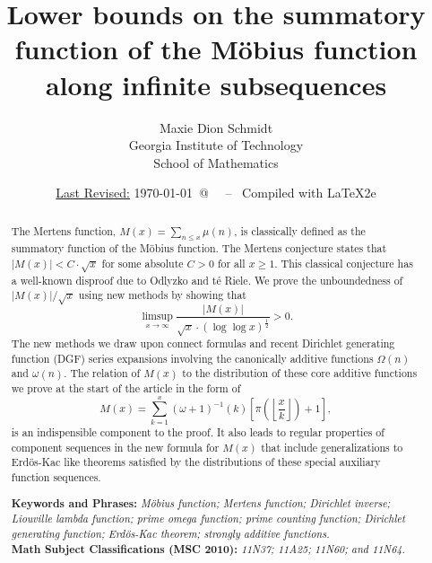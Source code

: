 \documentclass[11pt,reqno,a4letter]{article}
\title{
       \LARGE{
       Lower bounds on the summatory function of the M\"obius function along infinite subsequences 
       } 
}
\author{{\Large Maxie Dion Schmidt} \\ 
        {\normalsize Georgia Institute of Technology} \\[0.025cm] 
        {\normalsize School of Mathematics} 
}
\date{\small\underline{Last Revised:} \today \ @\ \hhmmsstime{} \ -- \ Compiled with \LaTeX2e}
\numberwithin{figure}{section}
\numberwithin{table}{section}
\theoremstyle{plain}
\numberwithin{theorem}{section}
\theoremstyle{definition}
\begin{document}
 

\maketitle

\begin{abstract} 
The Mertens function, $M(x) = \sum_{n \leq x} \mu(n)$, is classically 
defined as the summatory function of the M\"obius function. 
The Mertens conjecture states that $|M(x)| < C \cdot \sqrt{x}$ for some absolute $C > 0$ for all 
$x \geq 1$. 
This classical conjecture has a well-known disproof due to 
Odlyzko and t\'{e} Riele. 
We prove the unboundedness of $|M(x)| / \sqrt{x}$ using new methods by showing that 
$$\limsup_{x \rightarrow \infty} \frac{|M(x)|}{\sqrt{x} \cdot (\log\log x)^{\frac{1}{2}}} > 0.$$ 
The new methods we draw upon connect formulas and recent 
Dirichlet generating function (DGF) series expansions involving the canonically 
additive functions $\Omega(n)$ and $\omega(n)$. 
The relation of $M(x)$ to the distribution of these core additive functions 
we prove at the start of the article in the form of 
\[
M(x) = \sum_{k=1}^{x} (\omega + 1)^{-1}(k) \left[\pi\left(\left\lfloor \frac{x}{k} \right\rfloor\right) + 1\right],
\]
is an indispensible component to the proof. 
It also leads to regular properties of component sequences in the new formula for $M(x)$ that include 
generalizations to Erd\"os-Kac like theorems satisfied by the distributions of these special auxiliary 
function sequences. 

\bigskip 
\noindent
\textbf{Keywords and Phrases:} {\it M\"obius function; Mertens function; 
                                    Dirichlet inverse; Liouville lambda function; prime omega function; 
                                    prime counting function; Dirichlet generating function; 
                                    Erd\"os-Kac theorem; strongly additive functions. } \\ 
\textbf{Math Subject Classifications (MSC 2010):} {\it 11N37; 11A25; 11N60; and 11N64. } 
\end{abstract} 
\end{document}
